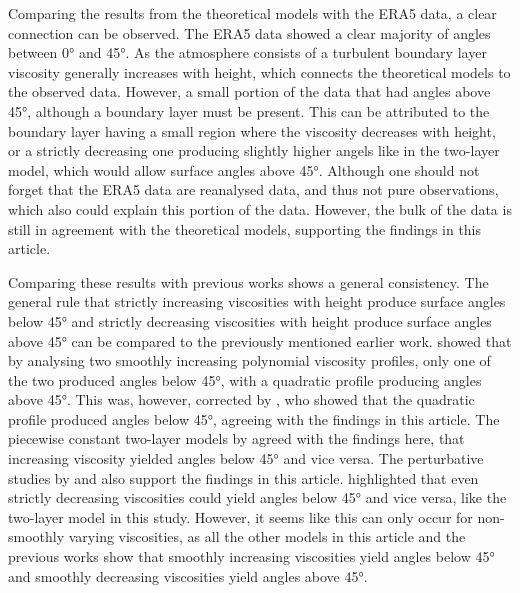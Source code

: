 Comparing the results from the theoretical models with the ERA5 data, a clear connection can be observed. The ERA5 data showed a clear majority of angles between \ang{0} and \ang{45}. As the atmosphere consists of a turbulent boundary layer viscosity generally increases with height, which connects the theoretical models to the observed data. However, a small portion of the data that had angles above \ang{45}, although a boundary layer must be present. This can be attributed to the boundary layer having a small region where the viscosity decreases with height, or a strictly decreasing one producing slightly higher angels like in the two-layer model, which would allow surface angles above \ang{45}. Although one should not forget that the ERA5 data are reanalysed data, and thus not pure observations, which also could explain this portion of the data. However, the bulk of the data is still in agreement with the theoretical models, supporting the findings in this article.

Comparing these results with previous works shows a general consistency. The general rule that strictly increasing viscosities with height produce surface angles below \ang{45} and strictly decreasing viscosities with height produce surface angles above \ang{45} can be compared to the previously mentioned earlier work. \citet{ionescu-kruse2021} showed that by analysing two smoothly increasing polynomial viscosity profiles, only one of the two produced angles below \ang{45}, with a quadratic profile producing angles above \ang{45}. This was, however, corrected by \citet{guan2023}, who showed that the quadratic profile produced angles below \ang{45}, agreeing with the findings in this article. The piecewise constant two-layer models by \citet{dritschel2020} agreed with the findings here, that increasing viscosity yielded angles below \ang{45} and vice versa. The perturbative studies by \citet{bressan2019} and \citet{constantin2021} also support the findings in this article. \citet{constantin2021} highlighted that even strictly decreasing viscosities could yield angles below \ang{45} and vice versa, like the two-layer model in this study. However, it seems like this can only occur for non-smoothly varying viscosities, as all the other models in this article and the previous works show that smoothly increasing viscosities yield angles below \ang{45} and smoothly decreasing viscosities yield angles above \ang{45}.

